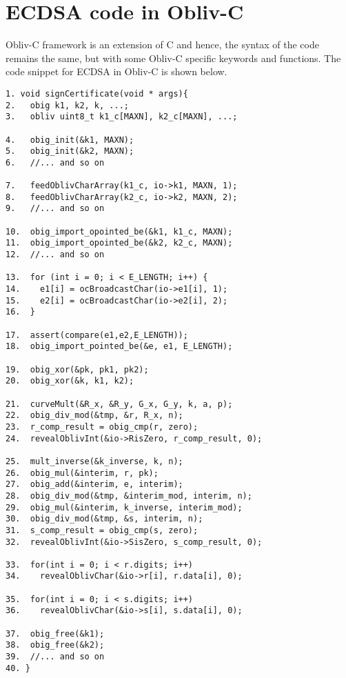 




\appendix
\section{ECDSA code in Obliv-C}
Obliv-C framework is an extension of C and hence, the syntax of the code remains the same, but with some Obliv-C specific keywords and functions.  The code snippet for ECDSA in Obliv-C is shown below.

\small{
\begin{lstlisting} 
1. void signCertificate(void * args){
2.   obig k1, k2, k, ...;
3.   obliv uint8_t k1_c[MAXN], k2_c[MAXN], ...;

4.   obig_init(&k1, MAXN);
5.   obig_init(&k2, MAXN);
6.   //... and so on
  
7.   feedOblivCharArray(k1_c, io->k1, MAXN, 1);
8.   feedOblivCharArray(k2_c, io->k2, MAXN, 2);
9.   //... and so on

10.  obig_import_opointed_be(&k1, k1_c, MAXN);
11.  obig_import_opointed_be(&k2, k2_c, MAXN);
12.  //... and so on 
  
13.  for (int i = 0; i < E_LENGTH; i++) {
14.    e1[i] = ocBroadcastChar(io->e1[i], 1);
15.    e2[i] = ocBroadcastChar(io->e2[i], 2);
16.  }
  
17.  assert(compare(e1,e2,E_LENGTH));
18.  obig_import_pointed_be(&e, e1, E_LENGTH);

19.  obig_xor(&pk, pk1, pk2);
20.  obig_xor(&k, k1, k2);
  
21.  curveMult(&R_x, &R_y, G_x, G_y, k, a, p);
22.  obig_div_mod(&tmp, &r, R_x, n);
23.  r_comp_result = obig_cmp(r, zero);
24.  revealOblivInt(&io->RisZero, r_comp_result, 0);

25.  mult_inverse(&k_inverse, k, n);
26.  obig_mul(&interim, r, pk);
27.  obig_add(&interim, e, interim);
28.  obig_div_mod(&tmp, &interim_mod, interim, n);
29.  obig_mul(&interim, k_inverse, interim_mod);
30.  obig_div_mod(&tmp, &s, interim, n);
31.  s_comp_result = obig_cmp(s, zero);
32.  revealOblivInt(&io->SisZero, s_comp_result, 0);

33.  for(int i = 0; i < r.digits; i++)
34.    revealOblivChar(&io->r[i], r.data[i], 0);

35.  for(int i = 0; i < s.digits; i++)
36.    revealOblivChar(&io->s[i], s.data[i], 0);

37.  obig_free(&k1);
38.  obig_free(&k2);
39.  //... and so on  
40. }
\end{lstlisting}
}

